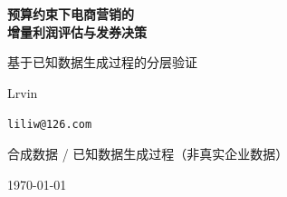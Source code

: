 \documentclass[UTF8, fontset=windows, a4paper, zihao=5]{ctexart}
\begin{document}
\begin{titlepage}
\centering
\vspace*{3.2cm}
{\sffamily\bfseries\fontsize{22pt}{30pt}\selectfont
 预算约束下电商营销的\\[6pt]
 增量利润评估与发券决策\par}
\vspace{1.2cm}
{\sffamily\Large 基于已知数据生成过程的分层验证\par}
\vspace{2.4cm}
{\sffamily\large Lrvin\par}
\vspace{0.35cm}
{\sffamily\large \texttt{liliw@126.com}\par}
\vfill
{\sffamily\small 合成数据 / 已知数据生成过程（非真实企业数据）\par}
\vspace{0.5cm}
{\sffamily\small \today\par}
\end{titlepage}


\newpage

\tableofcontents
\newpage



\clearpage
\printbibliography[heading=bibintoc, title={参考文献}]

\clearpage
\appendix

\end{document}
